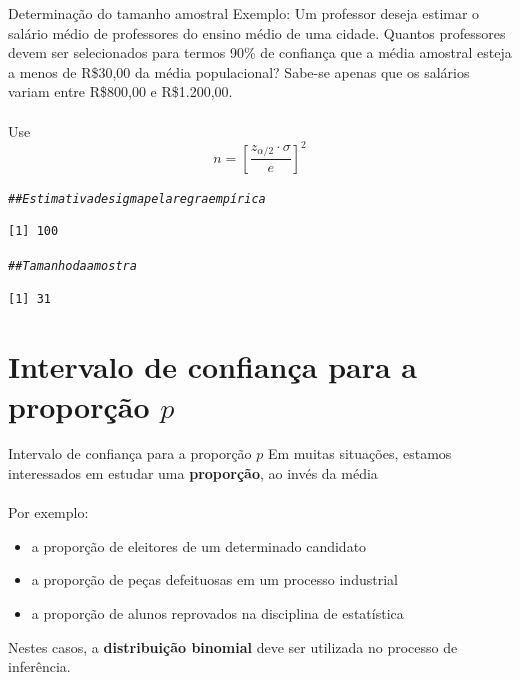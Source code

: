 \documentclass[10pt]{beamer}\usepackage[]{graphicx}\usepackage[]{color}
\makeatletter
\newcommand{\hlcom}[1]{\textcolor[rgb]{0.678,0.584,0.686}{\textit{#1}}}%
\newenvironment{kframe}{%
 \def\at@end@of@kframe{}%
 \ifinner\ifhmode%
  \def\at@end@of@kframe{\end{minipage}}%
  \begin{minipage}{\columnwidth}%
 \fi\fi%
 \def\FrameCommand##1{\hskip\@totalleftmargin \hskip-\fboxsep
 \colorbox{shadecolor}{##1}\hskip-\fboxsep
     \hskip-\linewidth \hskip-\@totalleftmargin \hskip\columnwidth}%
 \MakeFramed {\advance\hsize-\width
   \@totalleftmargin\z@ \linewidth\hsize
   \@setminipage}}%
 {\par\unskip\endMakeFramed%
 \at@end@of@kframe}
\newenvironment{knitrout}{}{} %
\theoremstyle{definition}
\makeatother
\begin{document}
\begin{frame}[fragile]{Determinação do tamanho amostral}
  Exemplo: Um professor deseja estimar o salário médio de professores
  do ensino médio de uma cidade. Quantos professores devem ser
  selecionados para termos 90\% de confiança que a média amostral esteja
  a menos de R\$30,00 da média populacional? Sabe-se apenas que os
  salários variam entre R\$800,00 e R\$1.200,00.\\~\\
  Use
  \begin{equation*}
    n = \left[ \frac{z_{\alpha/2} \cdot \sigma}{e} \right]^2
  \end{equation*}
\begin{knitrout}\footnotesize
{}\color{fgcolor}\begin{kframe}
\begin{alltt}
\hlcom{## Estimativa de sigma pela regra empírica}
\end{alltt}
\begin{verbatim}
[1] 100
\end{verbatim}
\begin{alltt}
\hlcom{## Tamanho da amostra}
\end{alltt}
\begin{verbatim}
[1] 31
\end{verbatim}
\end{kframe}
\end{knitrout}
\end{frame}

\section{Intervalo de confiança para a proporção $p$}

\begin{frame}{Intervalo de confiança para a proporção $p$}
  Em muitas situações, estamos interessados em estudar uma
  \textbf{proporção}, ao invés da média \\~\\
  Por exemplo:
  \begin{itemize}
  \item a proporção de eleitores de um determinado candidato
  \item a proporção de peças defeituosas em um processo industrial
  \item a proporção de alunos reprovados na disciplina de estatística
  \end{itemize}
  \vspace{1em}
  Nestes casos, a \textbf{distribuição binomial} deve ser utilizada no
  processo de inferência.
\end{frame}
\end{document}
